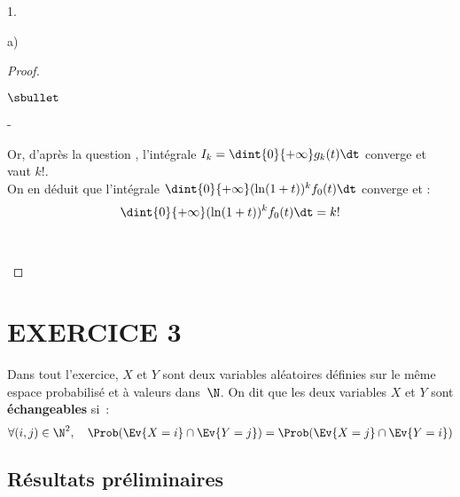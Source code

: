 \documentclass[11pt]{article}%
\begin{document}
\begin{noliste}{1.}
\begin{noliste}{a)}
\begin{proof}
\begin{noliste}{$\sbullet$}
\begin{noliste}{-}
      \item Or, d'après la question , l'intégrale 
        $I_k=\dint{0}{+\infty} g_k(t) \dt$ converge et vaut $k!$.\\
        On en déduit que l'intégrale $\dint{0}{+\infty} (\ln(1+t))^k f_0(t) 
        \dt$ converge et :
        \[
        \dint{0}{+\infty} (\ln(1+t))^k f_0(t) \dt = k!
        \]
      \end{noliste}
      ~\\[-1.2cm]
    \end{noliste}
  \end{proof}
\end{noliste}
\end{noliste}




\section*{EXERCICE 3}

\noindent
Dans tout l'exercice, $X$ et $Y$ sont deux variables aléatoires
définies sur le même espace probabilisé et à valeurs dans~$\N$. On dit
que les deux variables $X$ et $Y$ sont \textbf{échangeables} si~:
\[ 
\forall (i, j) \in \N^2, \quad \Prob(\Ev{X=i} \cap \Ev{Y=j}) = 
\Prob(\Ev{X=j} \cap \Ev{Y=i}) 
\]

\subsection*{Résultats préliminaires}
\end{document}
